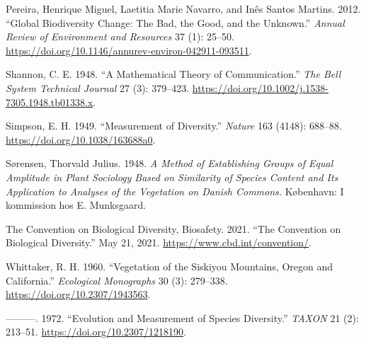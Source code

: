 \documentclass[
  12pt,
  oneside]{report}
\begin{document}
\leavevmode\hypertarget{ref-pereira_global_2012}{}%
Pereira, Henrique Miguel, Laetitia Marie Navarro, and Inês Santos Martins. 2012. ``Global Biodiversity Change: The Bad, the Good, and the Unknown.'' \emph{Annual Review of Environment and Resources} 37 (1): 25--50. \url{https://doi.org/10.1146/annurev-environ-042911-093511}.

\leavevmode\hypertarget{ref-shannon_mathematical_1948}{}%
Shannon, C. E. 1948. ``A Mathematical Theory of Communication.'' \emph{The Bell System Technical Journal} 27 (3): 379--423. \url{https://doi.org/10.1002/j.1538-7305.1948.tb01338.x}.

\leavevmode\hypertarget{ref-simpson_measurement_1949}{}%
Simpson, E. H. 1949. ``Measurement of Diversity.'' \emph{Nature} 163 (4148): 688--88. \url{https://doi.org/10.1038/163688a0}.

\leavevmode\hypertarget{ref-sorensen_method_1948}{}%
Sørensen, Thorvald Julius. 1948. \emph{A Method of Establishing Groups of Equal Amplitude in Plant Sociology Based on Similarity of Species Content and Its Application to Analyses of the Vegetation on Danish Commons.} København: I kommission hos E. Munksgaard.

\leavevmode\hypertarget{ref-the_convention_on_biological_diversity_convention_2021}{}%
The Convention on Biological Diversity, Biosafety. 2021. ``The Convention on Biological Diversity.'' May 21, 2021. \url{https://www.cbd.int/convention/}.

\leavevmode\hypertarget{ref-whittaker_vegetation_1960}{}%
Whittaker, R. H. 1960. ``Vegetation of the Siskiyou Mountains, Oregon and California.'' \emph{Ecological Monographs} 30 (3): 279--338. \url{https://doi.org/10.2307/1943563}.

\leavevmode\hypertarget{ref-whittaker_evolution_1972}{}%
---------. 1972. ``Evolution and Measurement of Species Diversity.'' \emph{TAXON} 21 (2): 213--51. \url{https://doi.org/10.2307/1218190}.
\end{document}
